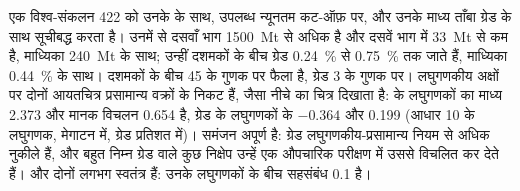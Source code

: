 एक विश्व-संकलन 422  को उनके  के साथ, उपलब्ध न्यूनतम कट-ऑफ़ पर, और उनके
माध्य ताँबा ग्रेड के साथ सूचीबद्ध करता है। उनमें से दसवाँ भाग \qty{1500}{Mt} से अधिक है और दसवें भाग में
\qty{33}{Mt} से कम है, माध्यिका \qty{240}{Mt} के साथ; उन्हीं दशमकों के बीच ग्रेड \qty{0.24}{\percent} से
\qty{0.75}{\percent} तक जाते हैं, माध्यिका \qty{0.44}{\percent} के साथ। दशमकों के बीच  45 के गुणक पर
फैला है, ग्रेड 3 के गुणक पर। लघुगणकीय अक्षों पर दोनों आयतचित्र प्रसामान्य वक्रों के निकट हैं, जैसा नीचे का
चित्र दिखाता है:  के लघुगणकों का माध्य 2.373 और मानक विचलन 0.654 है, ग्रेड के लघुगणकों के
$-0.364$ और 0.199 (आधार 10 के लघुगणक,  मेगाटन में, ग्रेड प्रतिशत में)। समंजन अपूर्ण है: ग्रेड
लघुगणकीय-प्रसामान्य नियम से अधिक नुकीले हैं, और बहुत निम्न ग्रेड वाले कुछ निक्षेप उन्हें एक औपचारिक
परीक्षण में उससे विचलित कर देते हैं। और दोनों लगभग स्वतंत्र हैं: उनके लघुगणकों के बीच सहसंबंध
0.1 है।

